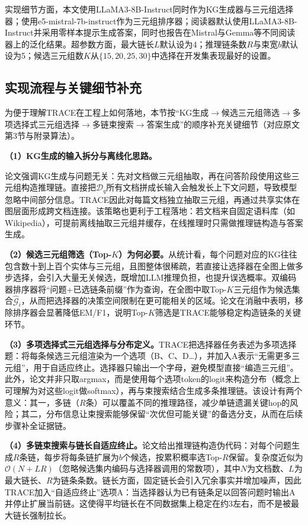 实现细节方面，本文使用LLaMA3-8B-Instruct同时作为KG生成器与三元组选择器；使用e5-mistral-7b-instruct作为三元组排序器；阅读器默认使用LLaMA3-8B-Instruct并采用零样本提示生成答案，同时也报告在Mistral与Gemma等不同阅读器上的泛化结果。超参数方面，最大链长$L$默认设为4；推理链条数$R$与束宽$b$默认设为5；候选三元组数$K$从$\{15,20,25,30\}$中选择在开发集表现最好的设置。

\subsection{实现流程与关键细节补充}
为便于理解TRACE在工程上如何落地，本节按“KG生成$\rightarrow$候选三元组筛选$\rightarrow$多项选择式三元组选择$\rightarrow$多链束搜索$\rightarrow$答案生成”的顺序补充关键细节（对应原文第3节与附录算法）。

\textbf{（1）KG生成的输入拆分与离线化思路。}\par
论文强调KG生成与问题无关：先对文档做三元组抽取，再在问答阶段使用这些三元组构造推理链。直接把$\mathcal{D}_q$所有文档拼成长输入会触发长上下文问题，导致模型忽略中间部分信息。TRACE因此对每篇文档独立抽取三元组，再通过共享实体在图层面形成跨文档连接。该策略也更利于工程落地：若文档来自固定语料库（如Wikipedia），可提前离线抽取三元组并缓存，在线推理时只需做推理链构造与答案生成。

\textbf{（2）候选三元组筛选（Top-$K$）为何必要。}从统计看，每个问题对应的KG往往包含数十到上百个实体与三元组，且图整体很稀疏，若直接让选择器在全图上做多步选择，会引入大量无关候选，既增加LLM推理负担，也提升误选概率。双编码器排序器将“问题+已选链条前缀”作为查询，在全图中取Top-$K$三元组作为候选集合$\hat{\mathcal{G}}_i$，从而把选择器的决策空间限制在更可能相关的区域。论文在消融中表明，移除排序器会显著降低EM/F1，说明Top-$K$筛选是TRACE能够稳定构造链条的关键环节。

\textbf{（3）多项选择式三元组选择与分布定义。}TRACE把选择器任务表述为多项选择题：将每条候选三元组渲染为一个选项（B、C、D…），并加入A表示“无需更多三元组”，用于自适应终止。选择器只输出一个字母，避免模型直接“编造三元组”。此外，论文并非只取argmax，而是使用每个选项token的logit来构造分布（概念上可理解为对这些logit做softmax），再与束搜索结合生成多条推理链。该设计有两个意义：其一，多链（$R$条）可以覆盖不同的推理路径，减少单链遗漏关键hop的风险；其二，分布信息让束搜索能够保留“次优但可能关键”的备选分支，从而在后续步骤补全证据链。

\textbf{（4）多链束搜索与链长自适应终止。}论文给出推理链构造伪代码：对每个问题生成$R$条链，每步将每条链扩展为$b$个候选，按累积概率选Top-$R$保留。复杂度近似为$\mathcal{O}(N+LR)$（忽略候选集内编码与选择器调用的常数项），其中$N$为文档数、$L$为最大链长、$R$为链条条数。链长方面，固定链长会引入冗余事实并增加噪声，因此TRACE加入“自适应终止”选项A：当选择器认为已有链条足以回答问题时输出A并停止扩展当前链。这使得平均链长在不同数据集上稳定在约3左右，而不是被最大链长强制拉长。

